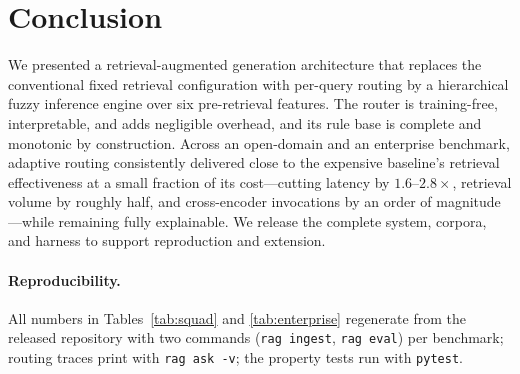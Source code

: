 \documentclass[11pt]{article}
\begin{document}
\section{Conclusion}

We presented a retrieval-augmented generation architecture that replaces the
conventional fixed retrieval configuration with per-query routing by a
hierarchical fuzzy inference engine over six pre-retrieval features. The
router is training-free, interpretable, and adds negligible overhead, and its
rule base is complete and monotonic by construction. Across an open-domain and
an enterprise benchmark, adaptive routing consistently delivered close to the
expensive baseline's retrieval effectiveness at a small fraction of its
cost---cutting latency by $1.6$--$2.8\times$, retrieval volume by roughly
half, and cross-encoder invocations by an order of magnitude---while remaining
fully explainable. We release the complete
system, corpora, and harness to support reproduction and extension.

\paragraph{Reproducibility.}
All numbers in Tables~\ref{tab:squad} and \ref{tab:enterprise} regenerate from
the released repository with two commands (\texttt{rag ingest},
\texttt{rag eval}) per benchmark; routing traces print with
\texttt{rag ask -v}; the property tests run with \texttt{pytest}.



\end{document}
